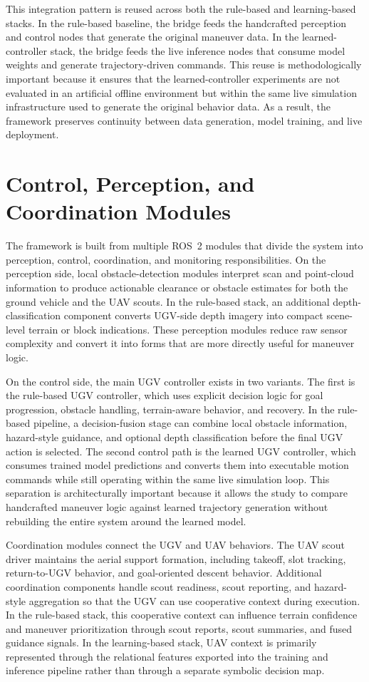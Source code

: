 This integration pattern is reused across both the rule-based and learning-based stacks. In the rule-based baseline, the bridge feeds the handcrafted perception and control nodes that generate the original maneuver data. In the learned-controller stack, the bridge feeds the live inference nodes that consume model weights and generate trajectory-driven commands. This reuse is methodologically important because it ensures that the learned-controller experiments are not evaluated in an artificial offline environment but within the same live simulation infrastructure used to generate the original behavior data. As a result, the framework preserves continuity between data generation, model training, and live deployment.

\section{Control, Perception, and Coordination Modules}

The framework is built from multiple ROS~2 modules that divide the system into perception, control, coordination, and monitoring responsibilities. On the perception side, local obstacle-detection modules interpret scan and point-cloud information to produce actionable clearance or obstacle estimates for both the ground vehicle and the UAV scouts. In the rule-based stack, an additional depth-classification component converts UGV-side depth imagery into compact scene-level terrain or block indications. These perception modules reduce raw sensor complexity and convert it into forms that are more directly useful for maneuver logic.

On the control side, the main UGV controller exists in two variants. The first is the rule-based UGV controller, which uses explicit decision logic for goal progression, obstacle handling, terrain-aware behavior, and recovery. In the rule-based pipeline, a decision-fusion stage can combine local obstacle information, hazard-style guidance, and optional depth classification before the final UGV action is selected. The second control path is the learned UGV controller, which consumes trained model predictions and converts them into executable motion commands while still operating within the same live simulation loop. This separation is architecturally important because it allows the study to compare handcrafted maneuver logic against learned trajectory generation without rebuilding the entire system around the learned model.

Coordination modules connect the UGV and UAV behaviors. The UAV scout driver maintains the aerial support formation, including takeoff, slot tracking, return-to-UGV behavior, and goal-oriented descent behavior. Additional coordination components handle scout readiness, scout reporting, and hazard-style aggregation so that the UGV can use cooperative context during execution. In the rule-based stack, this cooperative context can influence terrain confidence and maneuver prioritization through scout reports, scout summaries, and fused guidance signals. In the learning-based stack, UAV context is primarily represented through the relational features exported into the training and inference pipeline rather than through a separate symbolic decision map.

